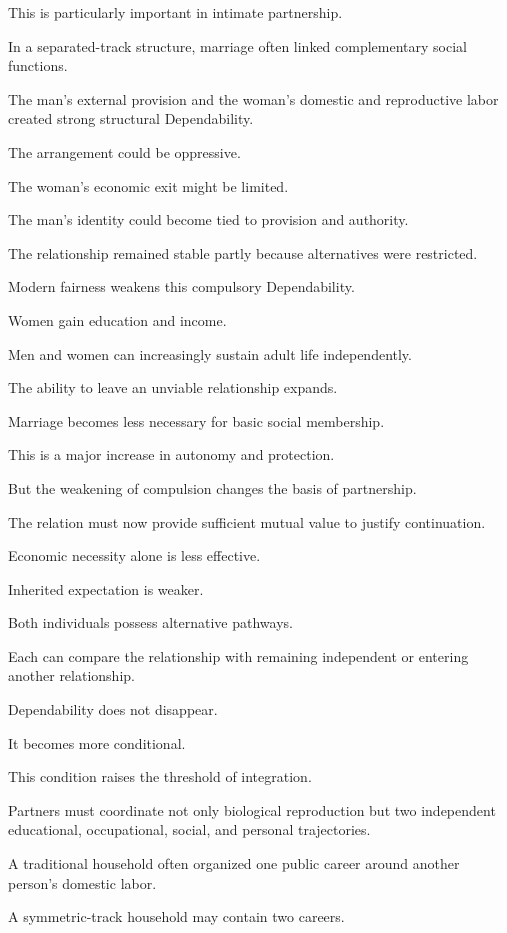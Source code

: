 This is particularly important in intimate partnership.

In a separated-track structure, marriage often linked complementary social functions.

The man’s external provision and the woman’s domestic and reproductive labor created strong structural Dependability.

The arrangement could be oppressive.

The woman’s economic exit might be limited.

The man’s identity could become tied to provision and authority.

The relationship remained stable partly because alternatives were restricted.

Modern fairness weakens this compulsory Dependability.

Women gain education and income.

Men and women can increasingly sustain adult life independently.

The ability to leave an unviable relationship expands.

Marriage becomes less necessary for basic social membership.

This is a major increase in autonomy and protection.

But the weakening of compulsion changes the basis of partnership.

The relation must now provide sufficient mutual value to justify continuation.

Economic necessity alone is less effective.

Inherited expectation is weaker.

Both individuals possess alternative pathways.

Each can compare the relationship with remaining independent or entering another relationship.

Dependability does not disappear.

It becomes more conditional.

This condition raises the threshold of integration.

Partners must coordinate not only biological reproduction but two independent educational, occupational, social, and personal trajectories.

A traditional household often organized one public career around another person’s domestic labor.

A symmetric-track household may contain two careers.

